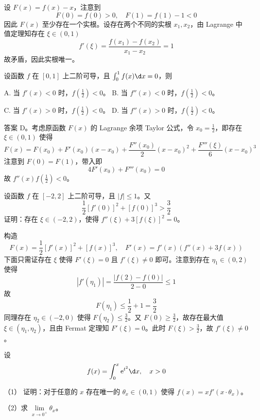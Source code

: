 \begin{solution}
	设 $F(x) = f(x) - x$，注意到
	\[ F(0) = f(0) > 0, \quad F(1) = f(1) - 1 < 0 \]
	因此 $F(x)$ 至少存在一个实根。设存在两个不同的实根 $x_1, x_2$，由 Lagrange 中值定理知存在 $\xi \in (0, 1)$
	\[ f'(\xi) = \frac{f(x_1) - f(x_2)}{x_1 - x_2} = 1 \]
	故矛盾，因此实根唯一。
\end{solution}


\begin{problem}[000023]
设函数 $f$ 在 $[0, 1]$ 上二阶可导，且 $\int_{0}^{1} f(x) \d x = 0$，则

A. 当 $f'(x) < 0$ 时，$f(\frac{1}{2}) < 0$。
B. 当 $f''(x) < 0$ 时，$f(\frac{1}{2}) < 0$。

C. 当 $f'(x) > 0$ 时，$f(\frac{1}{2}) < 0$。
D. 当 $f''(x) > 0$ 时，$f(\frac{1}{2}) < 0$。
\end{problem}

\begin{solution}
	答案 D。考虑原函数 $F(x)$ 的 Lagrange 余项 Taylor 公式，令 $x_0 = \frac{1}{2}$，即存在 $\xi \in (0, 1)$ 使得
	\[ F(x) = F(x_0) + F'(x_0)(x-x_0) + \frac{F''(x_0)}{2}(x-x_0)^2 + \frac{F'''(\xi)}{6}(x-x_0)^3 \]
	注意到 $F(0) = F(1)$，带入即
	\[ 4 F'(x_0) + F'''(x_0) = 0 \]
	故 $f''(x) f(\frac{1}{2}) < 0$。
\end{solution}


\begin{problem}[000024]
设函数 $f$ 在 $[-2, 2]$ 上二阶可导，且 $|f| \leqslant 1$。又
\[ \frac{1}{2}[f'(0)]^2 + [f(0)]^3 > \frac{3}{2} \]
证明：存在 $\xi \in (-2,2)$，使得 $f''(\xi) + 3[f(\xi)]^2 = 0$。
\end{problem}

\begin{solution}
	构造
	\[ F(x) = \frac{1}{2}[f'(x)]^2 + [f(x)]^3,\quad F'(x) = f'(x)(f''(x) + 3f(x)) \]
	下面只需证存在 $\xi$ 使得 $F'(\xi) = 0$ 且 $f'(\xi) \neq 0$ 即可。注意到存在 $\eta_1 \in (0, 2)$ 使得
	\[ |f'(\eta_1)| = \frac{|f(2) - f(0)|}{2 - 0} \leqslant 1 \]
	故
	\[ F(\eta_1) \leqslant \frac{1}{2} + 1 = \frac{3}{2} \]
	同理存在 $\eta_2 \in (-2, 0)$ 使得 $F(\eta_2) \leqslant \frac{3}{2}$。又 $F(0) \geqslant \frac{3}{2}$，故存在最大值 $\xi \in (\eta_1, \eta_2)$，且由 Fermat 定理知 $F'(\xi) = 0$。此时 $F(\xi) > \frac{3}{2}$，故 $f'(\xi) \neq 0$。
\end{solution}


\begin{problem}[000025]
设
\[ f(x) = \int_{0}^{x} \ee^{t^2} \d x, \quad x > 0 \]

（1） 证明：对于任意的 $x$ 存在唯一的 $\theta_x \in (0, 1)$ 使得 $f(x) = x f'(x \cdot \theta_x)$。

（2）求 $\lim\limits_{x \to 0^+} \theta_x$。
\end{problem}

